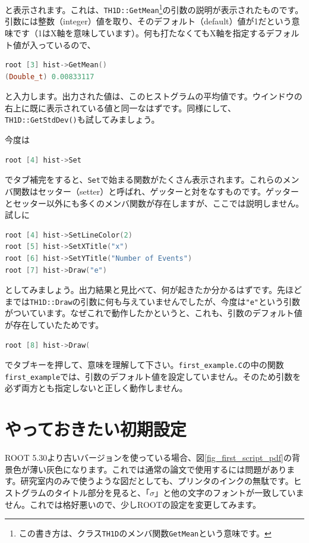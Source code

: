 と表示されます。これは、\texttt{TH1D::GetMean}\footnote{この書き方は、クラス\texttt{TH1D}のメンバ関数\texttt{GetMean}という意味です。}の引数の説明が表示されたものです。引数には整数（integer）値を取り、そのデフォルト（default）値が1だという意味です（1はX軸を意味しています）。何も打たなくてもX軸を指定するデフォルト値が入っているので、
\begin{lstlisting}[language=c++]
root [3] hist->GetMean()
(Double_t) 0.00833117
\end{lstlisting}
と入力します。出力された値は、このヒストグラムの平均値です。ウインドウの右上に既に表示されている値と同一なはずです。同様にして、\texttt{TH1D::GetStdDev()}も試してみましょう。

今度は
\begin{lstlisting}[language=c++]
root [4] hist->Set
\end{lstlisting}
でタブ補完をすると、\texttt{Set}で始まる関数がたくさん表示されます。これらのメンバ関数はセッター（setter）と呼ばれ、ゲッターと対をなすものです。ゲッターとセッター以外にも多くのメンバ関数が存在しますが、ここでは説明しません。試しに
\begin{lstlisting}[language=c++]
root [4] hist->SetLineColor(2)
root [5] hist->SetXTitle("x")
root [6] hist->SetYTitle("Number of Events")
root [7] hist->Draw("e")
\end{lstlisting}
としてみましょう。出力結果と見比べて、何が起きたか分かるはずです。先ほどまでは\texttt{TH1D::Draw}の引数に何も与えていませんでしたが、今度は\texttt{"e"}という引数がついています。なぜこれで動作したかというと、これも、引数のデフォルト値が存在していたためです。
\begin{lstlisting}[language=c++]
root [8] hist->Draw(
\end{lstlisting}
でタブキーを押して、意味を理解して下さい。\texttt{first\_example.C}の中の関数\texttt{first\_example}では、引数のデフォルト値を設定していません。そのため引数を必ず両方とも指定しないと正しく動作しません。

\section{やっておきたい初期設定}

ROOT 5.30より古いバージョンを使っている場合、図\ref{fig_first_script_pdf}の背景色が薄い灰色になります。これでは通常の論文で使用するには問題があります。研究室内のみで使うような図だとしても、プリンタのインクの無駄です。ヒストグラムのタイトル部分を見ると、「$\sigma$」と他の文字のフォントが一致していません。これでは格好悪いので、少しROOTの設定を変更してみます。

